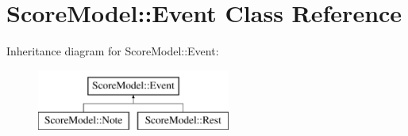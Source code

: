 \hypertarget{classScoreModel_1_1Event}{}\section{Score\+Model\+::Event Class Reference}
\label{classScoreModel_1_1Event}
Inheritance diagram for Score\+Model\+::Event\+:\begin{figure}[H]
\begin{center}
\leavevmode
\includegraphics[height=2.000000cm]{classScoreModel_1_1Event}
\end{center}
\end{figure}
